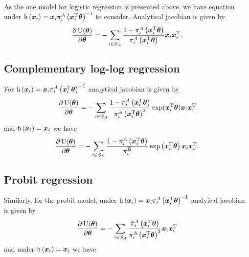 \documentclass[
  letterpaper,
  DIV=11,
  numbers=noendperiod]{scrreprt}
\begin{document}
As the one model for logistic regression is presented above, we have
equation under
\(\operatorname{h}\left(\boldsymbol{x}_i\right) = \boldsymbol{x}_i \pi_i^A\left(\boldsymbol{x}_i^{\mathrm{T}} \boldsymbol{\theta} \right)^{-1}\)
to consider. Analytical jacobian is given by \[
\begin{align*}
    \frac{\partial \operatorname{U}(\boldsymbol{\theta})}{\partial \boldsymbol{\theta}} = -\sum_{i \in S_A} \frac{1 - \pi_i^A\left(\boldsymbol{x}_i^{\mathrm{T}} \boldsymbol{\theta} \right)}{\pi_i^A\left(\boldsymbol{x}_i^{\mathrm{T}} \boldsymbol{\theta} \right)} \boldsymbol{x}_i \boldsymbol{x}_i^{\mathrm{T}}.
\end{align*}
\]

\hypertarget{complementary-log-log-regression-1}{%
\subsection{Complementary log-log
regression}\label{complementary-log-log-regression-1}}

For
\(\operatorname{h}\left(\boldsymbol{x}_i\right) = \boldsymbol{x}_i \pi_i^A\left(\boldsymbol{x}_i^{\mathrm{T}} \boldsymbol{\theta} \right)^{-1}\)
analytical jacobian is given by \[
\begin{align*}
    \frac{\partial \operatorname{U}(\boldsymbol{\theta})}{\partial \boldsymbol{\theta}} = - \sum_{i \in S_A} \frac{1 - \pi_i^A\left(\boldsymbol{x}_i^{\mathrm{T}} \boldsymbol{\theta} \right)}{\pi_i^A\left(\boldsymbol{x}_i^{\mathrm{T}} \boldsymbol{\theta} \right)^2} \exp(\boldsymbol{x}_i^{\mathrm{T}} \boldsymbol{\theta}) \boldsymbol{x}_i \boldsymbol{x}_i^{\mathrm{T}}
\end{align*}
\] and \(\operatorname{h}\left(\boldsymbol{x}_i\right) = \boldsymbol{x}_i\) we have \[
\begin{align*}
    \frac{\partial \operatorname{U}(\boldsymbol{\theta})}{\partial \boldsymbol{\theta}} = - \sum_{i \in S_B} \frac{1 - \pi_i^A\left(\boldsymbol{x}_i^{\mathrm{T}} \boldsymbol{\theta} \right)}{\pi_i^B} \exp \left(\boldsymbol{x}_i^\mathrm{T} \boldsymbol{\theta}\right) \boldsymbol{x}_i \boldsymbol{x}_i^{\mathrm{T}}.
\end{align*}
\]

\hypertarget{probit-regression-1}{%
\subsection{Probit regression}\label{probit-regression-1}}

Similarly, for the probit model, under
\(\operatorname{h}\left(\boldsymbol{x}_i\right) = \boldsymbol{x}_i \pi_i^A\left(\boldsymbol{x}_i^{\mathrm{T}} \boldsymbol{\theta} \right)^{-1}\)
analyical jacobian is given by \[
\begin{align*}
    \frac{\partial \operatorname{U}(\boldsymbol{\theta})}{\partial \boldsymbol{\theta}} = - \sum_{i \in S_A} \frac{\dot{\pi}_i^A\left(\boldsymbol{x}_i^{\mathrm{T}} \boldsymbol{\theta} \right)}{\pi_i^A\left(\boldsymbol{x}_i^{\mathrm{T}} \boldsymbol{\theta} \right)^2} \boldsymbol{x}_i \boldsymbol{x}_i^{\mathrm{T}}
\end{align*}
\] and under \(\operatorname{h}\left(\boldsymbol{x}_i\right) = \boldsymbol{x}_i\) we have
\end{document}
